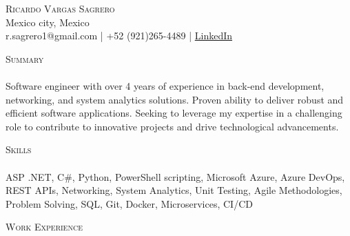 \documentclass[a4paper]{article}
\newcommand{\lineunder} {
    \vspace*{-8pt} \\
    \hspace*{-18pt} \hrulefill \\
}
\newcommand{\header} [1] {
    {\hspace*{-18pt}\vspace*{6pt} \textsc{#1}}
    \vspace*{-6pt} \lineunder
}
\begin{document}
\vspace*{-40pt}

    

\vspace*{-10pt}
\begin{center}
	{\Huge \scshape {Ricardo Vargas Sagrero}}\\
    Mexico city, Mexico \\
	r.sagrero1@gmail.com | +52 (921)265-4489 | \href{https://www.linkedin.com/in/ricardo-vargas-sagrero/}{LinkedIn}
\end{center}

\header{Summary}
\vspace{1mm}
Software engineer with over 4 years of experience in back-end development, networking, and system analytics solutions. Proven ability to deliver robust and efficient software applications. Seeking to leverage my expertise in a challenging role to contribute to innovative projects and drive technological advancements.
\vspace{2mm}

\header{Skills}
\vspace{1mm}
ASP .NET, C\#, Python, PowerShell scripting, Microsoft Azure, Azure DevOps, REST APIs, Networking, System Analytics, Unit Testing, Agile Methodologies, Problem Solving, SQL, Git, Docker, Microservices, CI/CD\\ 
\vspace{2mm}

\header{Work Experience}
\vspace{1mm}
\end{document}
